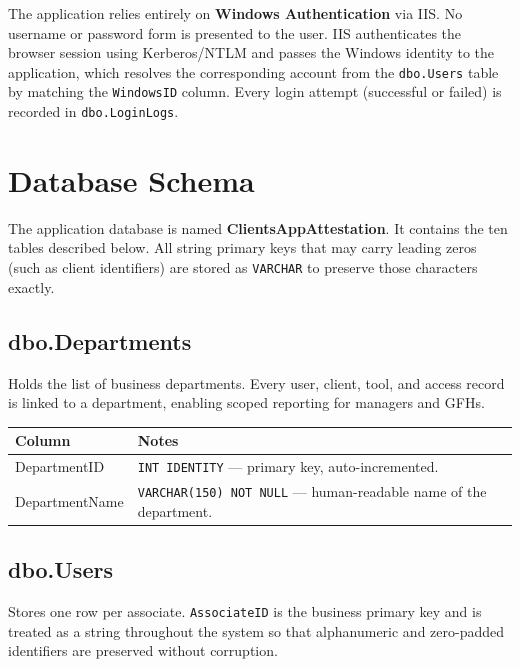 \documentclass[12pt,a4paper]{report}
\begin{document}
The application relies entirely on \textbf{Windows Authentication} via IIS. No username or
password form is presented to the user. IIS authenticates the browser session using
Kerberos/NTLM and passes the Windows identity to the application, which resolves the
corresponding account from the \texttt{dbo.Users} table by matching the \texttt{WindowsID}
column. Every login attempt (successful or failed) is recorded in \texttt{dbo.LoginLogs}.

\chapter{Database Schema}

The application database is named \textbf{ClientsAppAttestation}. It contains the ten tables
described below. All string primary keys that may carry leading zeros (such as client
identifiers) are stored as \texttt{VARCHAR} to preserve those characters exactly.

\section{dbo.Departments}

Holds the list of business departments. Every user, client, tool, and access record is linked
to a department, enabling scoped reporting for managers and GFHs.

\begin{longtable}{>{\ttfamily}p{4.5cm} >{\raggedright\arraybackslash}p{9.5cm}}
\toprule
\normalfont\textbf{Column} & \textbf{Notes} \\
\midrule
\endhead
DepartmentID & \texttt{INT IDENTITY} — primary key, auto-incremented. \\
DepartmentName & \texttt{VARCHAR(150) NOT NULL} — human-readable name of the department. \\
\bottomrule
\end{longtable}

\section{dbo.Users}

Stores one row per associate. \texttt{AssociateID} is the business primary key and is treated as
a string throughout the system so that alphanumeric and zero-padded identifiers are preserved
without corruption.
\end{document}
